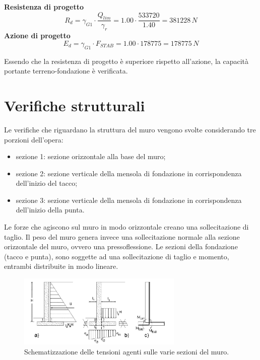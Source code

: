 \textbf{Resistenza di progetto}
\begin{equation*}
    R_d = \gamma_{G1} \cdot \frac{Q_{lim}}{\gamma_r} = 1.00 \cdot \frac{533720}{1.40} = 381228 \,N
\end{equation*}
\textbf{Azione di progetto}
\begin{equation*}
    E_d = \gamma_{G1} \cdot F_{STAB} = 1.00 \cdot 178775 = 178775 \,N
\end{equation*}

Essendo che la resistenza di progetto è superiore rispetto all'azione, la capacità portante terreno-fondazione è verificata.

\section{Verifiche strutturali}
Le verifiche che riguardano la struttura del muro vengono svolte considerando tre porzioni dell'opera:
\begin{itemize}
    \item sezione 1: sezione orizzontale alla base del muro;
    \item sezione 2: sezione verticale della mensola di fondazione in corrispondenza dell'inizio del tacco;
    \item sezione 3: sezione verticale della mensola di fondazione in corrispondenza dell'inizio della punta.
\end{itemize}
Le forze che agiscono sul muro in modo orizzontale creano una sollecitazione di taglio. Il peso del muro genera invece una sollecitazione normale alla sezione orizzontale del muro, ovvero una pressoflessione. Le sezioni della fondazione (tacco e punta), sono soggette ad una sollecitazione di taglio e momento, entrambi distribuite in modo lineare.
\begin{figure}[H]
    \centering
    \includegraphics[width=0.7\textwidth]{immagini/stati_limiti_strutturali.png} \hfill
        \caption{Schematizzazione delle tensioni agenti sulle varie sezioni del muro.}
    \label{figure:stati_limit_strutturali}
\end{figure}

